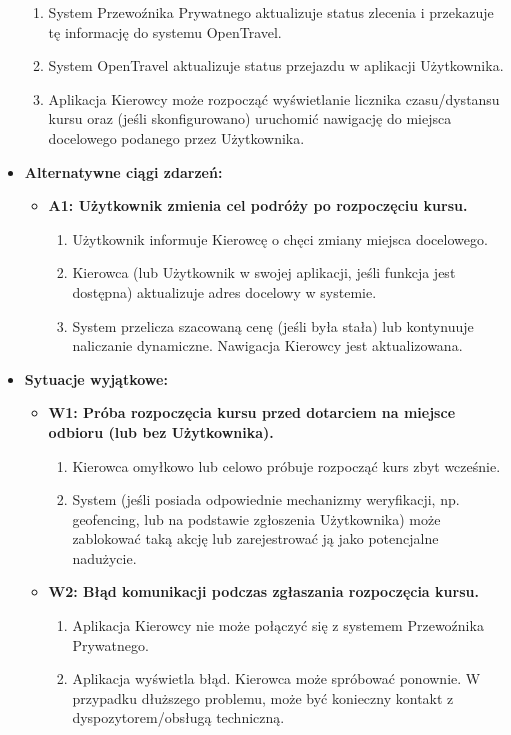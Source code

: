 \documentclass[a4paper,12pt]{article}
\begin{document}
\begin{itemize}
\begin{enumerate}
            \item System Przewoźnika Prywatnego aktualizuje status zlecenia i przekazuje tę informację do systemu OpenTravel.
            \item System OpenTravel aktualizuje status przejazdu w aplikacji Użytkownika.
            \item Aplikacja Kierowcy może rozpocząć wyświetlanie licznika czasu/dystansu kursu oraz (jeśli skonfigurowano) uruchomić nawigację do miejsca docelowego podanego przez Użytkownika.
        \end{enumerate}
    \item \textbf{Alternatywne ciągi zdarzeń:}
        \begin{itemize}
            \item \textbf{A1: Użytkownik zmienia cel podróży po rozpoczęciu kursu.}
                \begin{enumerate}
                    \item Użytkownik informuje Kierowcę o chęci zmiany miejsca docelowego.
                    \item Kierowca (lub Użytkownik w swojej aplikacji, jeśli funkcja jest dostępna) aktualizuje adres docelowy w systemie.
                    \item System przelicza szacowaną cenę (jeśli była stała) lub kontynuuje naliczanie dynamiczne. Nawigacja Kierowcy jest aktualizowana.
                \end{enumerate}
        \end{itemize}
    \item \textbf{Sytuacje wyjątkowe:}
        \begin{itemize}
            \item \textbf{W1: Próba rozpoczęcia kursu przed dotarciem na miejsce odbioru (lub bez Użytkownika).}
                \begin{enumerate}
                    \item Kierowca omyłkowo lub celowo próbuje rozpocząć kurs zbyt wcześnie.
                    \item System (jeśli posiada odpowiednie mechanizmy weryfikacji, np. geofencing, lub na podstawie zgłoszenia Użytkownika) może zablokować taką akcję lub zarejestrować ją jako potencjalne nadużycie.
                \end{enumerate}
            \item \textbf{W2: Błąd komunikacji podczas zgłaszania rozpoczęcia kursu.}
                \begin{enumerate}
                    \item Aplikacja Kierowcy nie może połączyć się z systemem Przewoźnika Prywatnego.
                    \item Aplikacja wyświetla błąd. Kierowca może spróbować ponownie. W przypadku dłuższego problemu, może być konieczny kontakt z dyspozytorem/obsługą techniczną.
                \end{enumerate}
        \end{itemize}
\end{itemize}
\end{document}
